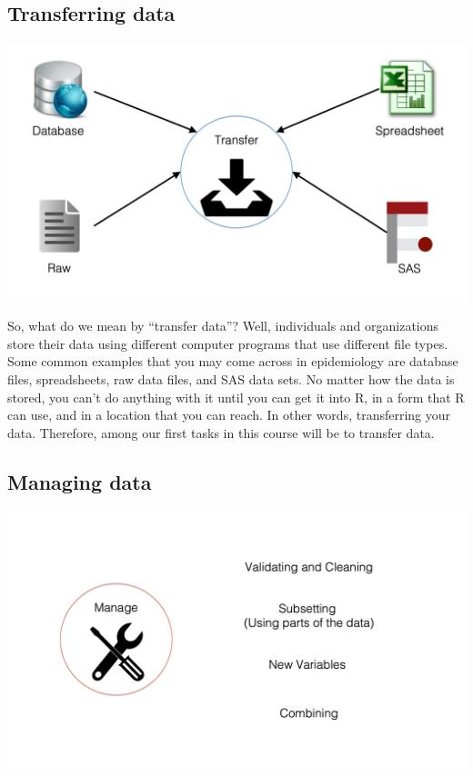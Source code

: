 \documentclass[
  letterpaper,
  DIV=11,
  numbers=noendperiod]{scrreprt}
\begin{document}
\subsection{Transferring data}\label{transferring-data}

\includegraphics{chapters/what_is_r/competencies_transfer.png}

So, what do we mean by ``transfer data''? Well, individuals and
organizations store their data using different computer programs that
use different file types. Some common examples that you may come across
in epidemiology are database files, spreadsheets, raw data files, and
SAS data sets. No matter how the data is stored, you can't do anything
with it until you can get it into R, in a form that R can use, and in a
location that you can reach. In other words, transferring your data.
Therefore, among our first tasks in this course will be to transfer
data.

\subsection{Managing data}\label{managing-data}

\includegraphics{chapters/what_is_r/competencies_manage.png}
\end{document}
